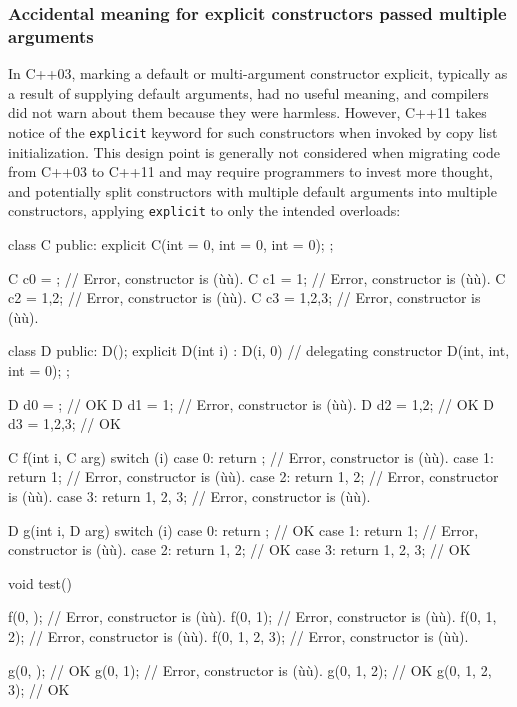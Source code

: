 \subsubsection[Accidental meaning for explicit constructors passed multiple arguments]{Accidental meaning for explicit constructors passed multiple arguments}\label{accidental-meaning-for-explicit-constructors-passed-multiple-arguments}

In C++03, marking a default or multi-argument constructor explicit,
typically as a result of supplying default arguments, had no useful
meaning, and compilers did not warn about them because they were
harmless. However, C++11 takes notice of the \lstinline!explicit! keyword
for such constructors when invoked by copy list initialization. This
design point is generally not considered when migrating code from C++03
to C++11 and may require programmers to invest more thought, and
potentially split constructors with multiple default arguments into
multiple constructors, applying \lstinline!explicit! to only the intended
overloads:

\begin{emcppslisting}
class C
{
public:
    explicit C(int = 0, int = 0, int = 0);
};

C c0 = {};       // Error, constructor is (ù{}ù).
C c1 = {1};      // Error, constructor is (ù{}ù).
C c2 = {1,2};    // Error, constructor is (ù{}ù).
C c3 = {1,2,3};  // Error, constructor is (ù{}ù).

class D
{
public:
    D();
    explicit D(int i) : D(i, 0) { }  // delegating constructor
    D(int, int, int = 0);
};

D d0 = {};       // OK
D d1 = {1};      // Error, constructor is (ù{}ù).
D d2 = {1,2};    // OK
D d3 = {1,2,3};  // OK

C f(int i, C arg)
{
    switch (i)
    {
        case 0: return {};         // Error, constructor is (ù{}ù).
        case 1: return {1};        // Error, constructor is (ù{}ù).
        case 2: return {1, 2};     // Error, constructor is (ù{}ù).
        case 3: return {1, 2, 3};  // Error, constructor is (ù{}ù).
    }
}

D g(int i, D arg)
{
    switch (i)
    {
      case 0: return {};         // OK
      case 1: return {1};        // Error, constructor is (ù{}ù).
      case 2: return {1, 2};     // OK
      case 3: return {1, 2, 3};  // OK
    }
}

void test()
{
    f(0, {});         // Error, constructor is (ù{}ù).
    f(0, {1});        // Error, constructor is (ù{}ù).
    f(0, {1, 2});     // Error, constructor is (ù{}ù).
    f(0, {1, 2, 3});  // Error, constructor is (ù{}ù).

    g(0, {});         // OK
    g(0, {1});        // Error, constructor is (ù{}ù).
    g(0, {1, 2});     // OK
    g(0, {1, 2, 3});  // OK
}
\end{emcppslisting}
    

